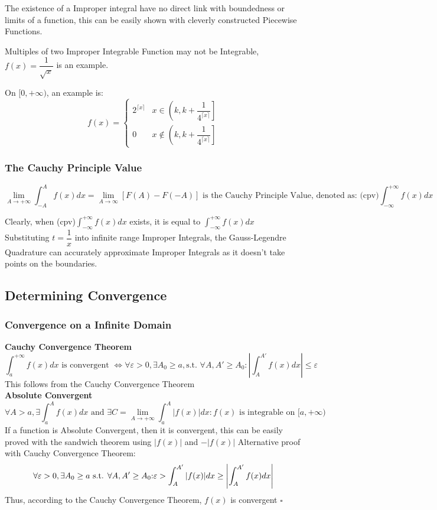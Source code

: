 \documentclass{article}
\newcommand{\0}{{\bf{0}}}
\begin{document}
The existence of a Improper integral have no direct link with boundedness or limits of a function, this can be easily shown with cleverly constructed Piecewise Functions.

Multiples of two Improper Integrable Function may not be Integrable, $f(x)=\dfrac{1}{\sqrt{x}}$ is an example.

On $[0,+\infty)$, an example is:
$$f(x)=\begin{cases}
        2^{\lceil x\rceil}&x\in\left(k,k+\dfrac{1}{4^{\lceil x\rceil}}\right]\\[8pt]
        0&x\notin\left(k,k+\dfrac{1}{4^{\lceil x\rceil}}\right]
    \end{cases}$$
\subsubsection{The Cauchy Principle Value}
$$\lim_{A\to+\infty}\int_{-A}^Af(x)dx=\lim_{A\to\infty}[F(A)-F(-A)]\mbox{ is the Cauchy Principle Value, denoted as: (cpv)}\int_{-\infty}^{+\infty}f(x)dx$$

Clearly, when (cpv)$\displaystyle\int_{-\infty}^{+\infty}f(x)dx$ exists, it is equal to $\displaystyle\int_{-\infty}^{+\infty}f(x)dx$\\
Substituting $t=\dfrac{1}{x}$ into infinite range Improper Integrals, the Gauss-Legendre Quadrature can accurately approximate Improper Integrals as it doesn't take points on the boundaries.
\subsection{Determining Convergence}
\subsubsection{Convergence on a Infinite Domain}
{\textbf{Cauchy Convergence Theorem}}
$$\int_a^{+\infty}f(x)dx\mbox{ is convergent }\iff\forall{}\varepsilon>0,\exists{}A_0\geq{}a,\mbox{s.t. }\forall{}A,A'\geq{}A_0:\left|\int_A^{A'}f(x)dx\right|\le\varepsilon$$
This follows from the Cauchy Convergence Theorem\\
\textbf{Absolute Convergent}
$$\forall{}A>a,\exists\int_a^Af(x)dx\mbox{ and }\exists{}C=\lim_{A\to+\infty}\int_a^A|f(x)|dx:f(x)\mbox{ is integrable on }[a,+\infty)$$
If a function is Absolute Convergent, then it is convergent, this can be easily proved with the sandwich theorem using $|f(x)|$ and $-|f(x)|$
Alternative proof with Cauchy Convergence Theorem:
$$\forall{}\varepsilon>0,\exists{}A_0\geq{}a\mbox{ s.t. }\forall{}A,A'\geq{}A_0\mbox:\varepsilon>\int_A^{A'}|f(x)|dx\geq\left|\int_A^{A'}f(x)dx\right|$$
Thus, according to the Cauchy Convergence Theorem, $f(x)$ is convergent
\null\hfill$\square$
\end{document}
